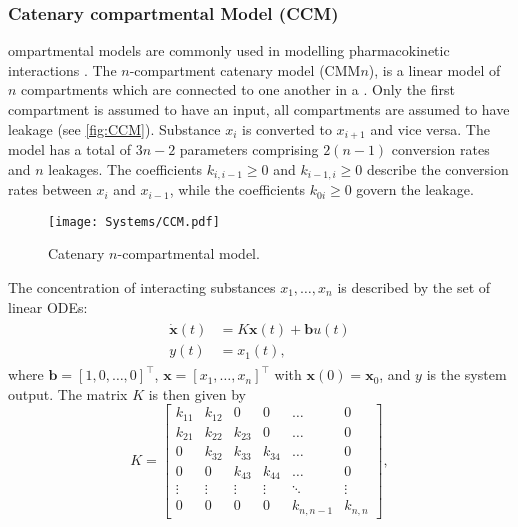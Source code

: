 \subsubsection{Catenary compartmental Model (CCM)}
ompartmental models are commonly used in modelling pharmacokinetic interactions \cite{jacquez1972, metzler1971, sager2015}. 
The $n$-compartment catenary model (CMM$n$), is a linear model of $n$ compartments which are connected to one another in a .
Only the first compartment is assumed to have an input,  all compartments are assumed to have leakage (see \autoref{fig:CCM}). 
Substance $x_{i}$ is converted to $x_{i+1}$ and vice versa. 
The model has a total of $3n - 2$ parameters comprising $2(n-1)$ conversion rates and $n$ leakages. 
The coefficients $k_{i,i-1} \geq 0$ and $k_{i-1,i} \geq 0$ describe the conversion rates between $x_{i}$ and $x_{i-1}$, while the coefficients $k_{0i} \geq 0$ govern the leakage. 
\begin{figure}[t!]
    \centering
    \texttt{[image: Systems/CCM.pdf]}
    \caption{Catenary $n$-compartmental model.}
    \label{fig:CCM}
\end{figure}
The concentration of interacting substances $x_{1},\ldots, x_{n}$ is described by the set of linear ODEs:
\begin{align}\label{eq:CM_dynamics}
    \begin{split}
        \dot{\mathbf{x}}(t) &= K\mathbf{x}(t) + \mathbf{b}u(t)\\
        y(t) &= x_{1}(t),
    \end{split}
\end{align}
where $\mathbf{b} = [1,0,\ldots,0]^{\top}$, $\mathbf{x} = [x_{1},\ldots,x_{n}]^{\top}$ with $\mathbf{x}(0) = \mathbf{x}_{0}$, and $y$ is the system output.
 The matrix $K$ is then given by
\begin{equation}
K = \begin{bmatrix}
        k_{11} & k_{12} & 0 & 0 & \ldots & 0 \\
        k_{21} & k_{22} & k_{23} & 0 & \ldots & 0 \\
        0 & k_{32} & k_{33} & k_{34} & \ldots & 0 \\
        0 & 0 & k_{43} & k_{44} & \ldots & 0 \\
        \vdots & \vdots & \vdots & \vdots & \ddots & \vdots \\
        0 & 0 & 0 & 0 & k_{n,n-1} & k_{n,n}
    \end{bmatrix},
\end{equation}
